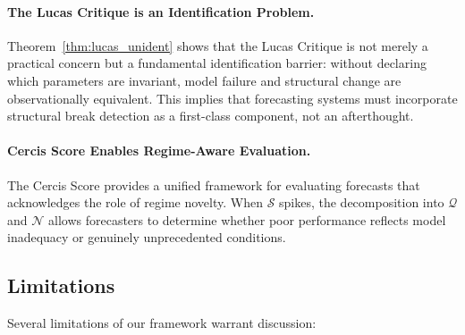 \documentclass[12pt,a4paper]{article}
\begin{document}
\paragraph{The Lucas Critique is an Identification Problem.}
Theorem~\ref{thm:lucas_unident} shows that the Lucas Critique is
not merely a practical concern but a fundamental identification
barrier: without declaring which parameters are invariant, model
failure and structural change are observationally equivalent.  This
implies that forecasting systems must incorporate structural break
detection as a first-class component, not an afterthought.

\paragraph{Cercis Score Enables Regime-Aware Evaluation.}
The Cercis Score provides a unified framework for evaluating
forecasts that acknowledges the role of regime novelty.  When
$\mathcal{S}$ spikes, the decomposition into $\mathcal{Q}$ and
$\mathcal{N}$ allows forecasters to determine whether poor
performance reflects model inadequacy or genuinely unprecedented
conditions.

\subsection{Limitations}

Several limitations of our framework warrant discussion:
\end{document}
